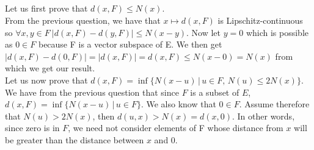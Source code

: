 \documentclass{article}
\begin{document}
\subsection{} %

Let us first prove that $d(x, F) \leq N(x)$. \\
From the previous question, we have that $x \mapsto d(x, F)$ is Lipschitz-continuous so $\forall x, y \in F \  |d(x, F) -d(y, F)| \leq N(x - y)$. Now let $y=0$ which is possible as $0 \in F$ because F is a vector subspace of E. We then get $|d(x, F) -d(0, F)| = |d(x, F)| = d(x, F) \leq N(x -0) = N(x)$ from which we get our result. \\

\noindent Let us now prove that $d(x, F) = \inf \{N(x-u) \,| \, u \in F, \, N(u) \leq 2N(x) \}$. We have from the previous question that since $F$ is a subset of $E$, $d(x, F) = \inf \{N(x-u) \,| \, u \in F\}$. We also know that $0 \in F$. Assume therefore that $N(u) > 2N(x)$, then $d(u,x) > N(x) = d(x,0)$. In other words, since zero is in $F$, we need not consider elements of F whose distance from $x$ will be greater than the distance between $x$ and $0$.

\subsection{} %
\end{document}
